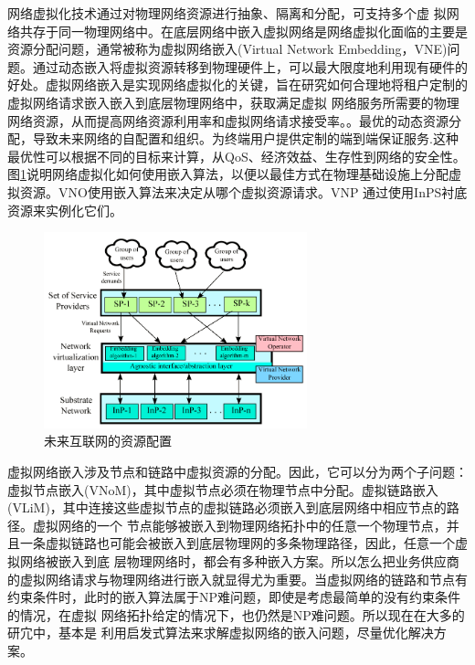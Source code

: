 网络虚拟化技术通过对物理网络资源进行抽象、隔离和分配，可支持多个虚 拟网络共存于同一物理网络中。在底层网络中嵌入虚拟网络是网络虚拟化面临的主要是资源分配问题，通常被称为虚拟网络嵌入(Virtual Network Embedding，VNE)问题。通过动态嵌入将虚拟资源转移到物理硬件上，可以最大限度地利用现有硬件的好处。虚拟网络嵌入是实现网络虚拟化的关键，旨在研究如何合理地将租户定制的虚拟网络请求嵌入嵌入到底层物理网络中，获取满足虚拟 网络服务所需要的物理网络资源，从而提高网络资源利用率和虚拟网络请求接受率。。最优的动态资源分配，导致未来网络的自配置和组织。为终端用户提供定制的端到端保证服务.这种最优性可以根据不同的目标来计算，从QoS、经济效益、生存性到网络的安全性。图\ref{fig:ResourceAllocationInFutureInternet}说明网络虚拟化如何使用嵌入算法，以便以最佳方式在物理基础设施上分配虚拟资源。VNO使用嵌入算法来决定从哪个虚拟资源请求。VNP 通过使用InPS衬底资源来实例化它们。
\begin{figure}[htbp]
\centering
\includegraphics[width=3.0in]{figures/ResourceAllocationInFutureInternet}
  \caption{未来互联网的资源配置}
  \label{fig:ResourceAllocationInFutureInternet}
\end{figure}

虚拟网络嵌入涉及节点和链路中虚拟资源的分配。因此，它可以分为两个子问题：虚拟节点嵌入(VNoM)，其中虚拟节点必须在物理节点中分配。虚拟链路嵌入(VLiM)，其中连接这些虚拟节点的虚拟链路必须嵌入到底层网络中相应节点的路径。虚拟网络的一个 节点能够被嵌入到物理网络拓扑中的任意一个物理节点，并且一条虚拟链路也可能会被嵌入到底层物理网的多条物理路径，因此，任意一个虚拟网络被嵌入到底 层物理网络时，都会有多种嵌入方案。所以怎么把业务供应商的虚拟网络请求与物理网络进行嵌入就显得尤为重要。当虚拟网络的链路和节点有约束条件时，此时的嵌入算法属于NP难问题\cite{amaldi2016computational}，即使是考虑最简单的没有约束条件的情况，在虚拟 网络拓扑给定的情况下，也仍然是NP难问题\cite{amaldi2016computational}。所以现在在大多的研宂中，基本是 利用启发式算法来求解虚拟网络的嵌入问题，尽量优化解决方案。



